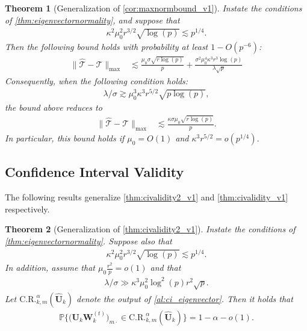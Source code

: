 \documentclass[10pt]{article}
\newcommand{\0}{{\mathbf{0}}}
\newcommand{\1}{{\mathbf{1}}}
\newcommand{\U}{{\mathbf{U}}}
\newcommand{\uhat}{\mathbf{\hat{U}}}
\newtheorem{theorem}{Theorem}
\newcommand{\p}{\mathbb{P}}
\renewcommand{\hat}{\widehat}
\renewcommand{\hat}{\widehat}
\begin{document}
\begin{theorem}[Generalization of \cref{cor:maxnormbound_v1}]\label{cor:maxnormbound}
Instate the conditions of \cref{thm:eigenvectornormality}, and suppose that
\begin{align*}
    \kappa^2 \mu_0^2 r^{3/2} \sqrt{\log(p)} \lesssim p^{1/4}.
\end{align*}
Then the following bound holds with probability at least $1 - O(p^{-6})$:
\begin{align*}
    \| \mathcal{\hat T} - \mathcal{T} \|_{\max} &\lesssim \frac{\mu_0\sigma \sqrt{r\log(p)}  }{p}  %
    + \frac{\sigma^2 \mu_0^4 \kappa^3 r^3 \log(p)}{\lambda \sqrt{p}} %
\end{align*}
Consequently, when the following condition holds:
\begin{align*}
   \lambda/\sigma \gtrsim  \mu_0^3 \kappa^3 r^{5/2} \sqrt{p\log(p)},
\end{align*}
the bound above reduces to
\begin{align*}
     \| \mathcal{\hat T} - \mathcal{T} \|_{\max} &\lesssim \frac{ \kappa \sigma \mu_0 \sqrt{r\log(p)}}{p}.
\end{align*}
In particular, this bound holds if $\mu_0 = O(1)$ and $\kappa^3 r^{5/2} = o(p^{1/4})$.
\end{theorem}

 
 \subsection{Confidence Interval Validity}
The following results generalize \cref{thm:civalidity2_v1} and \cref{thm:civalidity_v1} respectively.  
 \begin{theorem}[Generalization of \cref{thm:civalidity2_v1}]\label{thm:civalidity2}
 Instate the conditions of \cref{thm:eigenvectornormality}.   Suppose also that 
 \begin{align}
     \kappa^2 \mu_0^2 r^{3/2}\sqrt{\log(p)} \lesssim p^{1/4}. \label{technicalcondition}
 \end{align}
 In addition, assume that $\mu_0 \frac{r^2}{p} = o(1)$ and that
 \begin{align*}
     \lambda/\sigma \gg  \kappa^3 \mu_0^2 \log^2(p) r^2 \sqrt{p}.
 \end{align*}
 Let $\mathrm{C.R.}^{\alpha}_{k,m}(\uhat_k)$ denote  the output of \cref{al:ci_eigenvector}.  Then it holds that
 \begin{align*}
     \p\bigg\{ \bigg( \U_k \mathbf{W}_k^{(t)} \bigg)_{m\cdot} \in \mathrm{C.R.}^{\alpha}_{k,m}(\uhat_k) \bigg\} = 1- \alpha  - o(1).
 \end{align*}
   \end{theorem}
\end{document}
